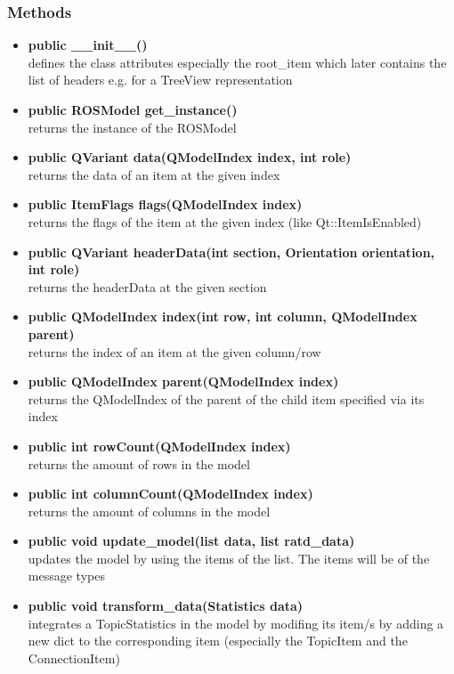 \subsubsection{Methods}
\begin{itemize}
  \item \textbf{public \_\_init\_\_()}\\ 
  defines the class attributes especially the root\_item which later contains the list of headers e.g. for a TreeView representation
  \item \textbf{public ROSModel get\_instance()}\\
  returns the instance of the ROSModel
  \item \textbf{public QVariant data(QModelIndex index, int role)}\\
  returns the data of an item at the given index
  \item \textbf{public ItemFlags flags(QModelIndex index)}\\
  returns the flags of the item at the given index (like Qt::ItemIsEnabled)
  \item \textbf{public QVariant headerData(int section, Orientation orientation, int role)}\\ 
  returns the headerData  at the given section
  \item \textbf{public QModelIndex index(int row, int column, QModelIndex parent)}\\
  returns the index of an item at the given column/row
  \item \textbf{public QModelIndex parent(QModelIndex index)}\\ 
  returns the QModelIndex of the parent of the child item specified via its index
  \item \textbf{public int rowCount(QModelIndex index)}\\ 
  returns the amount of rows in the model
  \item \textbf{public int columnCount(QModelIndex index)}\\
  returns the amount of columns in the model
  \item \textbf{public void update\_model(list data, list ratd\_data)}\\ 
  updates the model by using the items of the list. The items will be of the message types 
  \item \textbf{public void transform\_data(Statistics data)}\\ 
  integrates a TopicStatistics in the model by modifing its item/s by adding a new dict to the corresponding item (especially the TopicItem and the ConnectionItem)

\end{itemize}

